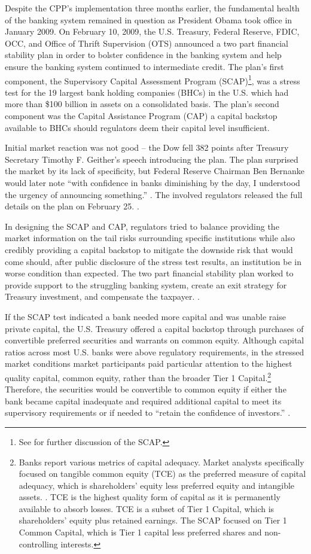 \documentclass[12pt]{article}
\begin{document}
Despite the CPP's implementation three months earlier, the fundamental health of the banking system remained in question as President Obama took office in January 2009. On February 10, 2009, the U.S. Treasury, Federal Reserve, FDIC, OCC, and Office of Thrift Supervision (OTS) announced a two part financial stability plan in order to bolster confidence in the banking system and help ensure the banking system continued to intermediate credit. The plan's first component, the Supervisory Capital Assessment Program (SCAP)\footnote{See \citet{Ross2016b} for further discussion of the SCAP.}, was a stress test for the 19 largest bank holding companies (BHCs) in the U.S. which had more than \$100 billion in assets on a consolidated basis. The plan's second component was the Capital Assistance Program (CAP) a capital backstop available to BHCs should regulators deem their capital level insufficient.

Initial market reaction was not good -- the Dow fell 382 points after Treasury Secretary Timothy F. Geither's speech introducing the plan. The plan surprised the market by its lack of specificity, but Federal Reserve Chairman Ben Bernanke would later note ``with confidence in banks diminishing by the day, I understood the urgency of announcing something.'' \citep{Bernanke}. The involved regulators released the full details on the plan on February 25. \citep{CAPTerms}.


In designing the SCAP and CAP, regulators tried to balance providing the market information on the tail risks surrounding specific institutions while also credibly providing a capital backstop to mitigate the downside risk that would come should, after public disclosure of the stress test results, an institution be in worse condition than expected. The two part financial stability plan worked to provide support to the struggling banking system, create an exit strategy for Treasury investment, and compensate the taxpayer. \citep{GW}.


If the SCAP test indicated a bank needed more capital and was unable raise private capital, the U.S. Treasury offered a capital backstop through purchases of convertible preferred securities and warrants on common equity. Although capital ratios across most U.S. banks were above regulatory requirements, in the stressed market conditions market participants paid particular attention to the highest quality capital, common equity, rather than the broader Tier 1 Capital.\footnote{Banks report various metrics of capital adequacy. Market analysts specifically focused on tangible common equity (TCE) as the preferred measure of capital adequacy, which is shareholders' equity less preferred equity and intangible assets. \citep{GW}. TCE is the highest quality form of capital as it is permanently available to absorb losses. TCE is a subset of Tier 1 Capital, which is shareholders' equity plus retained earnings. The SCAP focused on Tier 1 Common Capital, which is Tier 1 capital less preferred shares and non-controlling interests.} Therefore, the securities would be convertible to common equity if either the bank became capital inadequate and required additional capital to meet its supervisory requirements or if needed to ``retain the confidence of investors.'' \citep{WhitePaper}.
\end{document}
